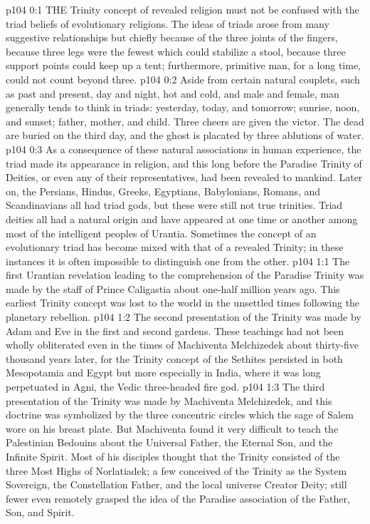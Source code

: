 \vs p104 0:1 THE Trinity concept of revealed religion must not be confused with the triad beliefs of evolutionary religions. The ideas of triads arose from many suggestive relationships but chiefly because of the three joints of the fingers, because three legs were the fewest which could stabilize a stool, because three support points could keep up a tent; furthermore, primitive man, for a long time, could not count beyond three.
\vs p104 0:2 Aside from certain natural couplets, such as past and present, day and night, hot and cold, and male and female, man generally tends to think in triads: yesterday, today, and tomorrow; sunrise, noon, and sunset; father, mother, and child. Three cheers are given the victor. The dead are buried on the third day, and the ghost is placated by three ablutions of water.
\vs p104 0:3 As a consequence of these natural associations in human experience, the triad made its appearance in religion, and this long before the Paradise Trinity of Deities, or even any of their representatives, had been revealed to mankind. Later on, the Persians, Hindus, Greeks, Egyptians, Babylonians, Romans, and Scandinavians all had triad gods, but these were still not true trinities. Triad deities all had a natural origin and have appeared at one time or another among most of the intelligent peoples of Urantia. Sometimes the concept of an evolutionary triad has become mixed with that of a revealed Trinity; in these instances it is often impossible to distinguish one from the other.
\vs p104 1:1 The first Urantian revelation leading to the comprehension of the Paradise Trinity was made by the staff of Prince Caligastia about one\hyp{}half million years ago. This earliest Trinity concept was lost to the world in the unsettled times following the planetary rebellion.
\vs p104 1:2 The second presentation of the Trinity was made by Adam and Eve in the first and second gardens. These teachings had not been wholly obliterated even in the times of Machiventa Melchizedek about thirty\hyp{}five thousand years later, for the Trinity concept of the Sethites persisted in both Mesopotamia and Egypt but more especially in India, where it was long perpetuated in Agni, the Vedic three\hyp{}headed fire god.
\vs p104 1:3 The third presentation of the Trinity was made by Machiventa Melchizedek, and this doctrine was symbolized by the three concentric circles which the sage of Salem wore on his breast plate. But Machiventa found it very difficult to teach the Palestinian Bedouins about the Universal Father, the Eternal Son, and the Infinite Spirit. Most of his disciples thought that the Trinity consisted of the three Most Highs of Norlatiadek; a few conceived of the Trinity as the System Sovereign, the Constellation Father, and the local universe Creator Deity; still fewer even remotely grasped the idea of the Paradise association of the Father, Son, and Spirit.
